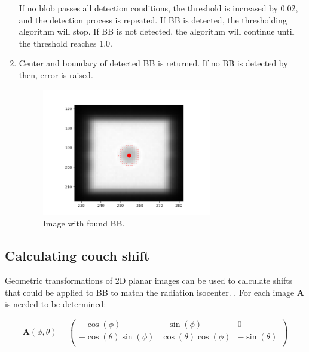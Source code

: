 \begin{enumerate}
    If no blob passes all detection conditions, the threshold is increased by 0.02, and the detection process is repeated. If BB is detected, the thresholding algorithm will stop. If BB is not detected, the algorithm will continue until the threshold reaches 1.0.

    \item Center and boundary of detected BB is returned. If no BB is detected by then, error is raised.

    \begin{figure}[H]
        \centering
        \includegraphics[width=0.7\textwidth]{Content/Images/bb_find_algo_thresholding_found.png}
        \caption{Image with found BB. \cite{pylinac_images}}
    \end{figure}
    
\end{enumerate}

\pagebreak

\subsection{Calculating couch shift} \label{subsec:couch_shift}

Geometric transformations of 2D planar images can be used to calculate shifts that could be applied to BB to match the radiation isocenter. \cite{low_et_al}. For each image $\mathbf{A}$ is needed to be determined:

\begin{equation}
    \mathbf{A}(\phi,\theta) = 
    \left(\begin{array}{ccc}
        -\cos(\phi) & -\sin(\phi) & 0\\
        -\cos(\theta)\sin(\phi) & \cos(\theta)\cos(\phi) & -\sin(\theta)\\
    \end{array} \right)
\end{equation}

